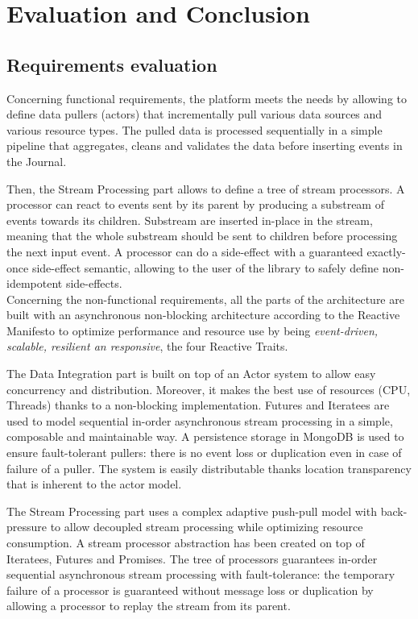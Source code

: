\chapter{Evaluation and Conclusion}

\section{Requirements evaluation}

Concerning functional requirements, the platform meets the needs by allowing to define data pullers (actors) that incrementally pull various data sources and various resource types.
The pulled data is processed sequentially in a simple pipeline that aggregates, cleans and validates the data before inserting events in the Journal.

Then, the Stream Processing part allows to define a tree of stream processors. A processor can react to events sent by its parent by producing a substream of events towards its children. Substream are inserted in-place in the stream, meaning that the whole substream should be sent to children before processing the next input event. A processor can do a side-effect with a guaranteed exactly-once side-effect semantic, allowing to the user of the library to safely define non-idempotent side-effects.
\\

Concerning the non-functional requirements, all the parts of the architecture are built with an asynchronous non-blocking architecture according to the Reactive Manifesto 
 to optimize performance and resource use by being \textit{event-driven, scalable, resilient an responsive}, the four Reactive Traits.

The Data Integration part is built on top of an Actor system to allow easy concurrency and distribution. Moreover, it makes the best use of resources (CPU, Threads) thanks to a non-blocking implementation. Futures and Iteratees are used to model sequential in-order asynchronous stream processing in a simple, composable and maintainable way. A persistence storage
in MongoDB is used to ensure fault-tolerant pullers: there is no event loss or duplication even in case of failure of a puller. The system is easily distributable 
thanks location transparency that is inherent to the actor model.

The Stream Processing part uses a complex adaptive push-pull model with back-pressure to allow decoupled stream processing while optimizing resource consumption. A stream processor abstraction has been created on top of Iteratees, Futures and Promises. The tree of processors guarantees in-order sequential asynchronous stream processing with fault-tolerance: the temporary failure of a processor is guaranteed without message loss or duplication by allowing a processor to replay the stream from its parent.
\\


